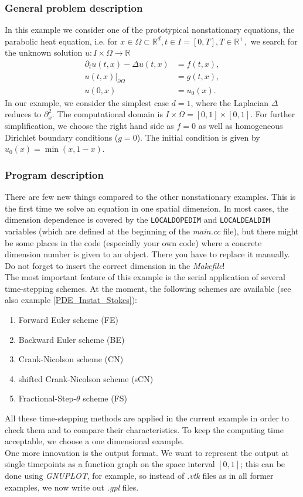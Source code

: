 \subsubsection{General problem description}

In this example we consider one of the prototypical nonstationary equations, the parabolic heat equation, i.e. for $x \in \Omega \subset \mathbb{R}^d, t\in I =[0,T], T\in \mathbb{R}^+,$ we search for the unknown solution $u:I \times \Omega \rightarrow \mathbb{R}$
\begin{align*}
\partial_t u(t,x) - \Delta u(t,x) &= f(t,x),\\
u(t,x)|_{\partial \Omega} &= g(t,x),\\
u(0,x) &= u_0(x).
\end{align*} In our example, we consider the simplest case $d=1$, where the Laplacian $\Delta$ reduces to $\partial_x^2$. The computational domain is $ I\times \Omega = [0,1] \times [0,1]$. For further simplification, we choose the right hand side as $f=0$ as well as homogeneous Dirichlet boundary conditions ($g=0$). The initial condition is given by $u_0(x) = \min(x,1-x)$.

\subsubsection{Program description}

There are few new things compared to the other nonstationary examples. This is the first time we solve an equation in one spatial dimension. In most cases, the dimension dependence is covered by the \texttt{LOCALDOPEDIM} and \texttt{LOCALDEALDIM} variables (which are defined at the beginning of the \textit{main.cc} file), but there might be some places in the code (especially your own code) where a concrete dimension number is given to an object. There you have to replace it manually. Do not forget to insert the correct dimension in the \textit{Makefile}!\\
The most important feature of this example is the serial application of several time-stepping schemes. At the moment, the following schemes are available (see also example \ref{PDE_Instat_Stokes}):
\begin{enumerate}
\item
Forward Euler scheme (FE)
\item
Backward Euler scheme (BE)
\item
Crank-Nicolson scheme (CN)
\item
shifted Crank-Nicolson scheme (sCN)
\item
Fractional-Step-$\theta$ scheme (FS)
\end{enumerate}
All these time-stepping methods are applied in the current example in order to check them and to compare their characteristics. To keep the computing time acceptable, we choose a one dimensional example.\\
One more innovation is the output format. We want to represent the output at single timepoints as a function graph on the space interval $[0,1]$; this can be done using \textit{GNUPLOT}, for example, so instead of \textit{.vtk} files as in all former examples, we now write out \textit{.gpl} files.
